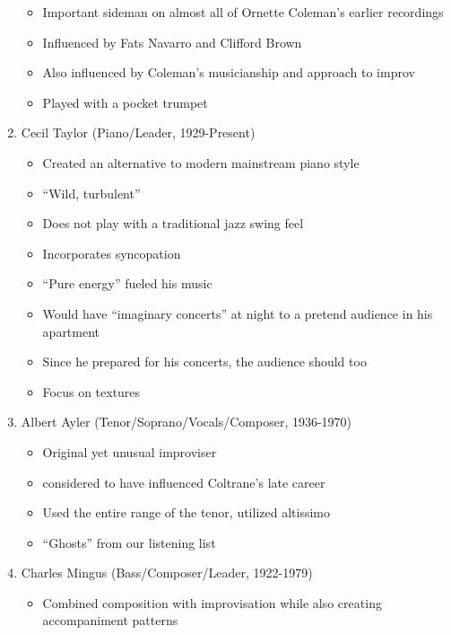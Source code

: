 \documentclass[]{article}
\providecommand{\tightlist}{%
  \setlength{\itemsep}{0pt}\setlength{\parskip}{0pt}}
\begin{document}
\begin{enumerate}
  \begin{itemize}
  \tightlist
  \item
    Important sideman on almost all of Ornette Coleman's earlier
    recordings
  \item
    Influenced by Fats Navarro and Clifford Brown
  \item
    Also influenced by Coleman's musicianship and approach to improv
  \item
    Played with a pocket trumpet
  \end{itemize}
\item
  Cecil Taylor (Piano/Leader, 1929-Present)

  \begin{itemize}
  \tightlist
  \item
    Created an alternative to modern mainstream piano style
  \item
    ``Wild, turbulent''
  \item
    Does not play with a traditional jazz swing feel
  \item
    Incorporates syncopation
  \item
    ``Pure energy'' fueled his music
  \item
    Would have ``imaginary concerts'' at night to a pretend audience in
    his apartment
  \item
    Since he prepared for his concerts, the audience should too
  \item
    Focus on textures
  \end{itemize}
\item
  Albert Ayler (Tenor/Soprano/Vocals/Composer, 1936-1970)

  \begin{itemize}
  \tightlist
  \item
    Original yet unusual improviser
  \item
    considered to have influenced Coltrane's late career
  \item
    Used the entire range of the tenor, utilized altissimo
  \item
    ``Ghosts'' from our listening list
  \end{itemize}
\item
  Charles Mingus (Bass/Composer/Leader, 1922-1979)

  \begin{itemize}
  \tightlist
  \item
    Combined composition with improvisation while also creating
    accompaniment patterns


\end{itemize}
\end{enumerate}
\end{document}
